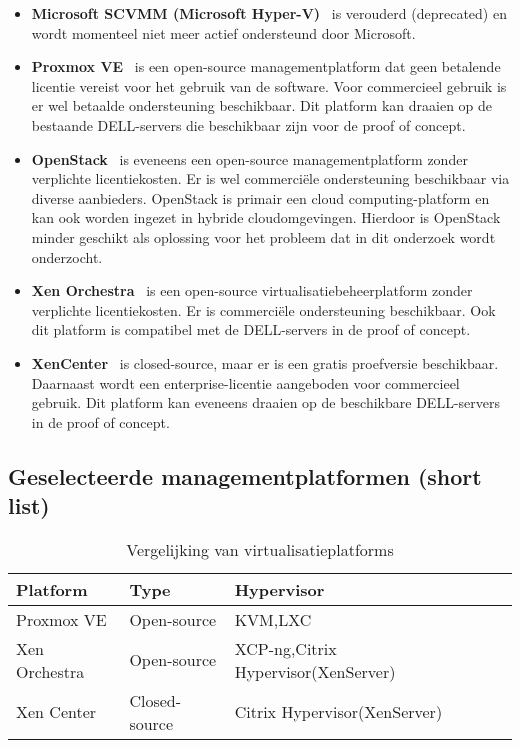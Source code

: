 \begin{itemize}
    \item \textbf{Microsoft SCVMM (Microsoft Hyper-V)}~\autocite{Eaton2019} is verouderd (deprecated) en wordt momenteel niet meer actief ondersteund door Microsoft.
    \item \textbf{Proxmox VE}~\autocite{Proxmox} is een open-source managementplatform dat geen betalende licentie vereist voor het gebruik van de software. Voor commercieel gebruik is er wel betaalde ondersteuning beschikbaar. Dit platform kan draaien op de bestaande DELL-servers die beschikbaar zijn voor de proof of concept.   
    \item \textbf{OpenStack}~\autocite{openstack2024} is eveneens een open-source managementplatform zonder verplichte licentiekosten. Er is wel commerciële ondersteuning beschikbaar via diverse aanbieders. OpenStack is primair een cloud computing-platform en kan ook worden ingezet in hybride cloudomgevingen. Hierdoor is OpenStack minder geschikt als oplossing voor het probleem dat in dit onderzoek wordt onderzocht.
    \item \textbf{Xen Orchestra}~\autocite{el2021server} is een open-source virtualisatiebeheerplatform zonder verplichte licentiekosten. Er is commerciële ondersteuning beschikbaar. Ook dit platform is compatibel met de DELL-servers in de proof of concept.
    \item \textbf{XenCenter}~\autocite{xencenter2024} is closed-source, maar er is een gratis proefversie beschikbaar. Daarnaast wordt een enterprise-licentie aangeboden voor commercieel gebruik. Dit platform kan eveneens draaien op de beschikbare DELL-servers in de proof of concept.
\end{itemize}

\subsection{Geselecteerde managementplatformen (short list)} 
\begin{table}[h!]
    \centering
    \begin{tabular}{|l|l|l|l|}
    \hline
    \textbf{Platform} & \textbf{Type} & \textbf{Hypervisor} \\ \hline
    \hline
    Proxmox VE        & Open-source   & KVM,LXC             \\ \hline
    Xen Orchestra  & Open-source & XCP-ng,Citrix Hypervisor(XenServer) \\ \hline
    Xen Center  & Closed-source & Citrix Hypervisor(XenServer) \\ \hline
    \hline
    \end{tabular}
    \caption{Vergelijking van virtualisatieplatforms}
\end{table}
\newpage
